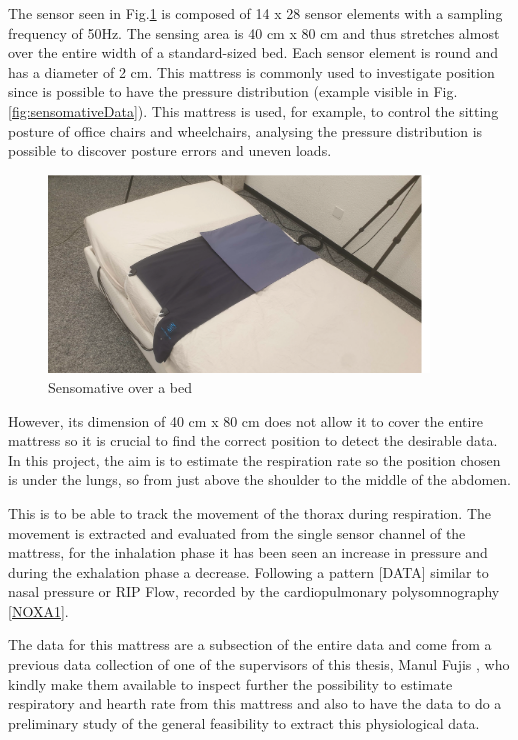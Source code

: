 The sensor seen in Fig.\ref{fig:sensomativeBed} is composed of 14 x 28 sensor elements with a sampling frequency of 50Hz. 
The sensing area is 40 cm x 80 cm and thus stretches almost over the entire width of a standard-sized bed. Each sensor element is round and has a diameter of 2 cm.
This mattress is commonly used to investigate position since is possible to have the pressure distribution (example visible in Fig.\ref{fig:sensomativeData}). This mattress is used, for example, to control the sitting posture of office chairs and wheelchairs, analysing the pressure distribution is possible to discover posture errors and uneven loads.\\

\vspace*{0.5cm}
\begin{figure}[H]
    \centering
    \includegraphics[width=0.9\textwidth]{img/sensomative.png}
    \caption{Sensomative over a bed}
    \label{fig:sensomativeBed}
\end{figure}
\vspace*{0.5cm}

However, its dimension of 40 cm x 80 cm does not allow it to cover the entire mattress so it is crucial to find the correct position to detect the desirable data. In this project, the aim is to estimate the respiration rate so the position chosen is under the lungs, so from just above the shoulder to the middle of the abdomen.

This is to be able to track the movement of the thorax during respiration. The movement is extracted and evaluated from the single sensor channel of the mattress, for the inhalation phase it has been seen an increase in pressure and during the exhalation phase a decrease. Following a pattern [DATA] similar to nasal pressure or RIP Flow, recorded by the cardiopulmonary polysomnography \ref{NOXA1}. 

The data for this mattress are a subsection of the entire data and come from a previous data collection of one of the supervisors of this thesis, Manul Fujis \cite{ManuelZurich}, who kindly make them available to inspect further the possibility to estimate respiratory and hearth rate from this mattress and also to have the data to do a preliminary study of the general feasibility to extract this physiological data. 



